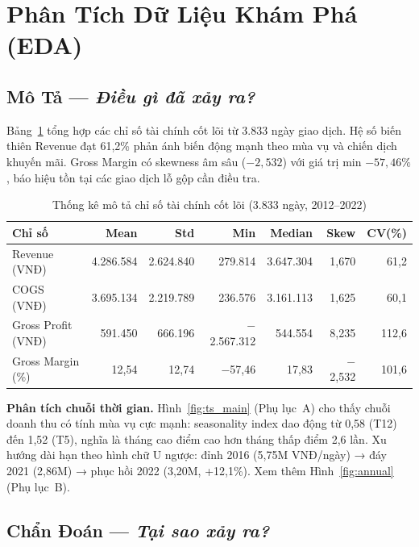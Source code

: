 \documentclass{article}
\begin{document}
\section{Phân Tích Dữ Liệu Khám Phá (EDA)}

\subsection{Mô Tả — \textit{Điều gì đã xảy ra?}}

Bảng~\ref{tab:desc} tổng hợp các chỉ số tài chính cốt lõi từ 3.833 ngày giao dịch.
Hệ số biến thiên Revenue đạt 61,2\% phản ánh biến động mạnh theo mùa vụ và chiến dịch khuyến mãi. Gross Margin có skewness âm sâu ($-2,532$) với giá trị min $-57,46\%$, báo hiệu tồn tại các giao dịch lỗ gộp cần điều tra.

\begin{table}[h!]
\centering
\caption{Thống kê mô tả chỉ số tài chính cốt lõi (3.833 ngày, 2012–2022)}
\label{tab:desc}
\small
\begin{tabular}{lrrrrrr}
\toprule
\textbf{Chỉ số} & \textbf{Mean} & \textbf{Std} & \textbf{Min} & \textbf{Median} & \textbf{Skew} & \textbf{CV(\%)} \\
\midrule
Revenue (VNĐ)      & 4.286.584 & 2.624.840 & 279.814  & 3.647.304 & 1,670  & 61,2 \\
COGS (VNĐ)         & 3.695.134 & 2.219.789 & 236.576  & 3.161.113 & 1,625  & 60,1 \\
Gross Profit (VNĐ) & 591.450   & 666.196   & $-$2.567.312 & 544.554 & 8,235 & 112,6 \\
Gross Margin (\%)  & 12,54     & 12,74     & $-$57,46 & 17,83    & $-$2,532 & 101,6 \\
\bottomrule
\end{tabular}
\end{table}

\textbf{Phân tích chuỗi thời gian.} Hình~\ref{fig:ts_main} (Phụ lục~A) cho thấy chuỗi doanh thu có tính mùa vụ cực mạnh: seasonality index dao động từ 0,58 (T12) đến 1,52 (T5), nghĩa là tháng cao điểm cao hơn tháng thấp điểm 2,6 lần. Xu hướng dài hạn theo hình chữ U ngược: đỉnh 2016 (5,75M VNĐ/ngày) → đáy 2021 (2,86M) → phục hồi 2022 (3,20M, +12,1\%). Xem thêm Hình~\ref{fig:annual} (Phụ lục~B).

\subsection{Chẩn Đoán — \textit{Tại sao xảy ra?}}
\end{document}
